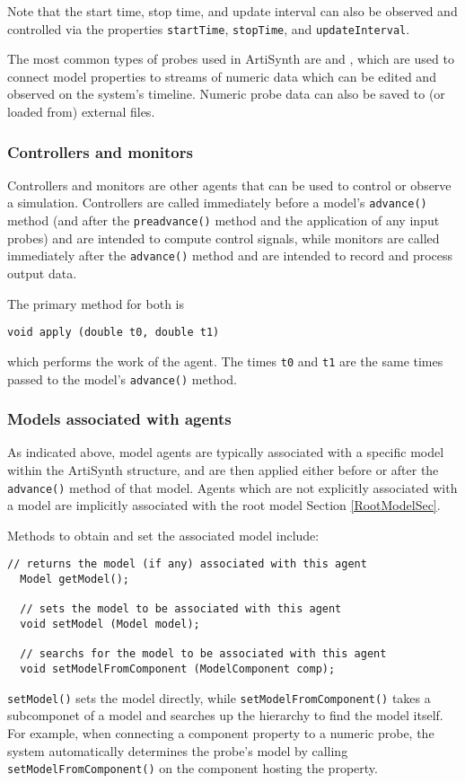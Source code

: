 \documentclass{article}
\begin{document}
Note that the start time, stop time, and update interval can also be
observed and controlled via the properties {\tt startTime}, {\tt stopTime},
and {\tt updateInterval}.

The most common types of probes used in ArtiSynth are
 and
, which are used
to connect model properties to streams of numeric data which can be
edited and observed on the system's timeline. Numeric probe data can
also be saved to (or loaded from) external files.

\subsubsection{Controllers and monitors}

Controllers and monitors are other agents that can be used to control
or observe a simulation. Controllers are called immediately before a
model's {\tt advance()} method (and after the {\tt preadvance()}
method and the application of any input probes) and are intended to
compute control signals, while monitors are called immediately after
the {\tt advance()} method and are intended to record and process
output data.

The primary method for both is

\begin{lstlisting}[]
  void apply (double t0, double t1)
\end{lstlisting}

which performs the work of the agent. The times {\tt t0} and {\tt t1}
are the same times passed to the model's {\tt advance()} method.

\subsubsection{Models associated with agents}
\label{AssociatedModelsSec}

As indicated above, model agents are typically associated with a
specific model within the ArtiSynth structure, and are then applied
either before or after the {\tt advance()} method of that model.  Agents
which are not explicitly associated with a model are implicitly
associated with the root model Section \ref{RootModelSec}.

Methods to obtain and set the associated model include:
\begin{lstlisting}[]
  // returns the model (if any) associated with this agent
  Model getModel();

  // sets the model to be associated with this agent
  void setModel (Model model);

  // searchs for the model to be associated with this agent
  void setModelFromComponent (ModelComponent comp);
\end{lstlisting}
{\tt setModel()} sets the model directly, while {\tt setModelFromComponent()}
takes a subcomponet of a model and searches up the hierarchy to find
the model itself. For example, when connecting a component property to
a numeric probe, the system automatically determines the probe's model
by calling {\tt setModelFromComponent()} on the component hosting the
property.
\end{document}
